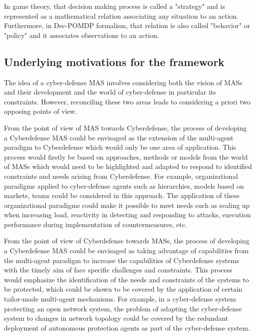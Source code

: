 \documentclass[conference]{IEEEtran}
\begin{document}
In game theory, that decision making process is called a "strategy" and is represented as a mathematical relation associating any situation to an action.
Furthermore, in Dec-POMDP formalism, that relation is also called "behavior" or "policy" and it associates observations to an action.

\subsection{Underlying motivations for the framework}

The idea of a cyber-defense MAS involves considering both the vision of MASs and their development and the world of cyber-defense in particular its constraints. However, reconciling these two areas leads to considering a priori two opposing points of view.

From the point of view of MAS towards Cyberdefense, the process of developing a Cyberdefense MAS could be envisaged as the extension of the multi-agent paradigm to Cyberdefense which would only be one area of application. This process would firstly be based on approaches, methods or models from the world of MASs which would need to be highlighted and adapted to respond to identified constraints and needs arising from Cyberdefense. For example, organizational paradigms applied to cyber-defense agents such as hierarchies, models based on markets, teams could be considered in this approach. The application of these organizational paradigms could make it possible to meet needs such as scaling up when increasing load, reactivity in detecting and responding to attacks, execution performance during implementation of countermeasures, etc.

From the point of view of Cyberdefense towards MASs, the process of developing a Cyberdefense MAS could be envisaged as taking advantage of capabilities from the multi-agent paradigm to increase the capabilities of Cyberdefense systems with the timely aim of face specific challenges and constraints. This process would emphasize the identification of the needs and constraints of the systems to be protected, which could be shown to be covered by the application of certain tailor-made multi-agent mechanisms. For example, in a cyber-defense system protecting an open network system, the problem of adapting the cyber-defense system to changes in network topology could be covered by the redundant deployment of autonomous protection agents as part of the cyber-defense system.
\end{document}
